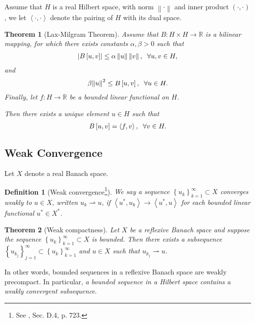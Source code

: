 \documentclass[11pt,a4paper,center,notitlepage]{article}
\numberwithin{equation}{section}
\newtheorem{definition}{Definition}[section]
\newtheorem{theorem}{Theorem}[section]
\begin{document}
Assume that $H$ is a real Hilbert space, with norm $\left\|  \cdot  \right\|$ and inner product $\left(\cdot,\cdot\right)$, we let $\left\langle { \cdot , \cdot } \right\rangle $ denote the pairing of $H$ with its dual space. 
\begin{theorem}[Lax-Milgram Theorem]
Assume that $B:H\times H\to \mathbb{R}$ is a bilinear mapping, for which there exists constants $\alpha,\beta >0$ such that
\begin{align}
\left| {B\left[ {u,v} \right]} \right| \le \alpha \left\| u \right\|\left\| v \right\|, \hspace{2mm}\forall u,v \in H,
\end{align}
and 
\begin{align}
\beta {\left\| u \right\|^2} \le B\left[ {u,v} \right], \hspace{2mm}\forall u \in H.
\end{align}
Finally, let $f:H\to \mathbb{R}$ be a bounded linear functional on $H$.

Then there exists a unique element $u\in H$ such that
\begin{align}
B\left[ {u,v} \right] = \left\langle {f,v} \right\rangle , \hspace{2mm}\forall v \in H.
\end{align}
\end{theorem}

\subsection{Weak Convergence}
Let $X$ denote a real Banach space.
\begin{definition}[Weak convergence\footnote{See \cite{1}, Sec. D.4, p. 723.}]
We say a sequence $\left\{ {{u_k}} \right\}_{k = 1}^\infty  \subset X$ \emph{converges weakly} to $u\in X$, written $u_k\rightharpoonup u$, if $\left\langle {{u^*},{u_k}} \right\rangle  \to \left\langle {{u^*},u} \right\rangle $ for each bounded linear functional $u^* \in X^*$.
\end{definition}

\begin{theorem}[Weak compactness] 
Let $X$ be a reflexive Banach space and suppose the sequence $\left\{ {{u_k}} \right\}_{k = 1}^\infty  \subset X$ is bounded. Then there exists a subsequence $\left\{ {{u_{{k_j}}}} \right\}_{j = 1}^\infty  \subset \left\{ {{u_k}} \right\}_{k = 1}^\infty $ and $u\in X$ such that $u_{k_j}\rightharpoonup u$. 
\end{theorem}
In other words, bounded sequences in a reflexive Banach space are weakly precompact. In particular, \textit{a bounded sequence in a Hilbert space contains a weakly convergent subsequence}.
\end{document}

